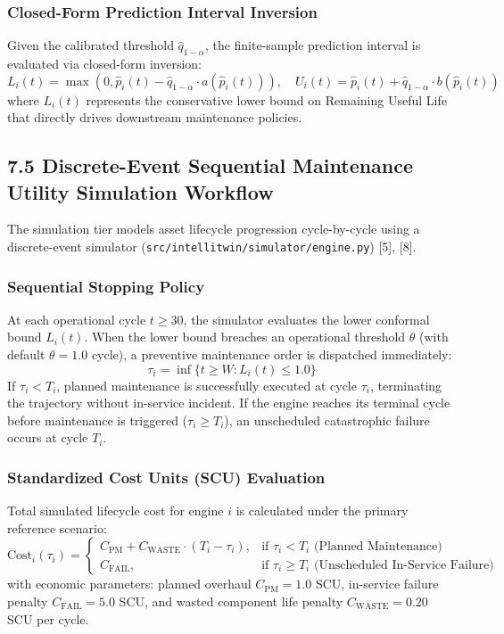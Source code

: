 \documentclass[12pt,a4paper]{article}
\begin{document}
\subsubsection*{Closed-Form Prediction Interval Inversion}
Given the calibrated threshold $\hat{q}_{1-\alpha}$, the finite-sample prediction interval is evaluated via closed-form inversion:
\begin{equation}
L_i(t) = \max(0, \hat{p}_i(t) - \hat{q}_{1-\alpha} \cdot a(\hat{p}_i(t))), \quad U_i(t) = \hat{p}_i(t) + \hat{q}_{1-\alpha} \cdot b(\hat{p}_i(t))
\end{equation}
where $L_i(t)$ represents the conservative lower bound on Remaining Useful Life that directly drives downstream maintenance policies.

\subsection*{7.5 Discrete-Event Sequential Maintenance Utility Simulation Workflow}
The simulation tier models asset lifecycle progression cycle-by-cycle using a discrete-event simulator (\texttt{src/intellitwin/simulator/engine.py}) [5], [8].

\subsubsection*{Sequential Stopping Policy}
At each operational cycle $t \ge 30$, the simulator evaluates the lower conformal bound $L_i(t)$. When the lower bound breaches an operational threshold $\theta$ (with default $\theta = 1.0$ cycle), a preventive maintenance order is dispatched immediately:
\begin{equation}
\tau_i = \inf \{ t \ge W : L_i(t) \le 1.0 \}
\end{equation}
If $\tau_i < T_i$, planned maintenance is successfully executed at cycle $\tau_i$, terminating the trajectory without in-service incident. If the engine reaches its terminal cycle before maintenance is triggered ($\tau_i \ge T_i$), an unscheduled catastrophic failure occurs at cycle $T_i$.

\subsubsection*{Standardized Cost Units (SCU) Evaluation}
Total simulated lifecycle cost for engine $i$ is calculated under the primary reference scenario:
\begin{equation}
\text{Cost}_i(\tau_i) = \begin{cases}
C_{\text{PM}} + C_{\text{WASTE}} \cdot (T_i - \tau_i), & \text{if } \tau_i < T_i \text{ (Planned Maintenance)} \\
C_{\text{FAIL}}, & \text{if } \tau_i \ge T_i \text{ (Unscheduled In-Service Failure)}
\end{cases}
\end{equation}
with economic parameters: planned overhaul $C_{\text{PM}} = 1.0$ SCU, in-service failure penalty $C_{\text{FAIL}} = 5.0$ SCU, and wasted component life penalty $C_{\text{WASTE}} = 0.20$ SCU per cycle.
\end{document}
